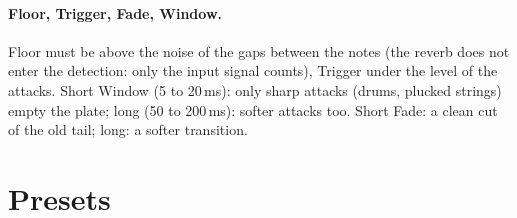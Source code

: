 \documentclass[a4paper,11pt]{article}
\begin{document}
\paragraph{Floor, Trigger, Fade, Window.} Floor must be above the noise of the gaps between the
notes (the reverb does not enter the detection: only the input signal counts), Trigger under the
level of the attacks. Short Window (5 to 20\,ms): only sharp attacks (drums, plucked strings)
empty the plate; long (50 to 200\,ms): softer attacks too. Short Fade: a clean cut of the old
tail; long: a softer transition.

\section{Presets}\label{sec:presets}
\end{document}
